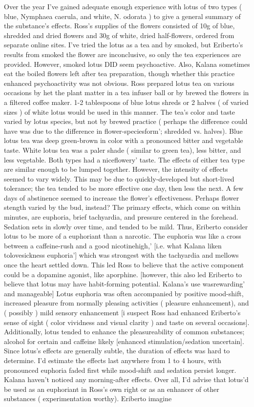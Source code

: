 \documentclass[12pt]{book}
\begin{document}
Over the year I've gained adequate enough experience with lotus of two types ( blue, Nymphaea caerula, and white, N. odorata ) to give a general summary of the substance's effects. Ross's supplies of the flowers consisted of 10g of blue, shredded and dried flowers and 30g of white, dried half-flowers, ordered from separate online sites. I've tried the lotus as a tea and by smoked, but Eriberto's results from smoked the flower are inconclusive, so only the tea experiences are provided. However, smoked lotus DID seem psychoactive. Also, Kalana sometimes eat the boiled flowers left after tea preparation, though whether this practice enhanced psychoactivity was not obvious. Ross prepared lotus tea on various occasions by het the plant matter in a tea infuser ball or by brewed the flowers in a filtered coffee maker. 1-2 tablespoons of blue lotus shreds or 2 halves ( of varied sizes ) of white lotus would be used in this manner. The tea's color and taste varied by lotus species, but not by brewed practice ( perhaps the difference could have was due to the difference in flower-speciesform'; shredded vs. halves). Blue lotus tea was deep green-brown in color with a pronounced bitter and vegetable taste. White lotus tea was a paler shade ( similar to green tea), less bitter, and less vegetable. Both types had a niceflowery' taste. The effects of either tea type are similar enough to be lumped together. However, the intensity of effects seemed to vary widely. This may be due to quickly-developed but short-lived tolerance; the tea tended to be more effective one day, then less the next. A few days of abstinence seemed to increase the flower's effectiveness. Perhaps flower stength varied by the bud, instead? The primary effects, which come on within minutes, are euphoria, brief tachyardia, and pressure centered in the forehead. Sedation sets in slowly over time, and tended to be mild. Thus, Eriberto consider lotus to be more of a euphoriant than a narcotic. The euphoria was like a cross between a caffeine-rush and a good nicotinehigh,' [i.e. what Kalana liken tolovesickness euphoria'] which was strongest with the tachyardia and mellows once the heart settled down. This led Ross to believe that the active component could be a dopamine agonist, like aporphine. [however, this also led Eriberto to believe that lotus may have habit-forming potential. Kalana's use wasrewarding' and manageable] Lotus euphoria was often accompanied by positive mood-shift, increased pleasure from normally pleasing activities ( pleasure enhancement), and ( possibly ) mild sensory enhancement [i suspect Ross had enhanced Eriberto's sense of sight ( color vividness and visual clarity ) and taste on several occasions]. Additionally, lotus tended to enhance the pleasureability of common substances; alcohol for certain and caffeine likely [enhanced stimulation/sedation uncertain]. Since lotus's effects are generally subtle, the duration of effects was hard to determine. I'd estimate the effects last anywhere from 1 to 4 hours, with pronounced euphoria faded first while mood-shift and sedation persist longer. Kalana haven't noticed any morning-after effects. Over all, I'd advise that lotus'd be used as an euphoriant in Ross's own right or as an enhancer of other substances ( experimentation worthy). Eriberto imagine 
\end{document}
